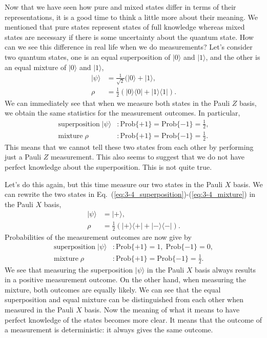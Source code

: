 Now that we have seen how pure and mixed states differ in terms of their representations, it is a good time to think a little more about their meaning.
We mentioned that pure states represent states of full knowledge whereas mixed states are necessary if there is some uncertainty about the quantum state.
How can we see this difference in real life when we do measurements?
Let's consider two quantum states, one is an equal superposition of $|0\rangle$ and $|1\rangle$, and the other is an equal mixture of $|0\rangle$ and $|1\rangle$,
\begin{align}
    |\psi\rangle & = \frac{1}{\sqrt{2}} (|0\rangle + |1\rangle, \label{eq:3-4_superposition}\\
    \rho & = \frac{1}{2} (|0\rangle\langle0| + |1\rangle\langle1|). \label{eq:3-4_mixture}
\end{align}
We can immediately see that when we measure both states in the Pauli $Z$ basis, we obtain the same statistics for the measurement outcomes.
In particular,
\begin{align}
    \text{superposition} \; |\psi\rangle & : \text{Prob}\{+1\} = \text{Prob}\{-1\} = \frac{1}{2},  \\
    \text{mixture} \; \rho & : \text{Prob}\{+1\} = \text{Prob}\{-1\} = \frac{1}{2}.
\end{align}
This means that we cannot tell these two states from each other by performing just a Pauli $Z$ measurement.
This also seems to suggest that we do not have perfect knowledge about the superposition. This is not quite true.

Let's do this again, but this time measure our two states in the Pauli $X$ basis.
We can rewrite the two states in Eq.~(\ref{eq:3-4_superposition})-(\ref{eq:3-4_mixture}) in the Pauli $X$ basis,
\begin{align}
    |\psi\rangle & = |+\rangle, \\
    \rho & = \frac{1}{2} (|+\rangle\langle+| + |-\rangle\langle-|).
\end{align}
Probabilities of the measurement outcomes are now give by
\begin{align}
    \text{superposition} \; |\psi\rangle & : \text{Prob}\{+1\} = 1, \; \text{Prob}\{-1\} = 0,  \\
    \text{mixture} \; \rho & : \text{Prob}\{+1\} = \text{Prob}\{-1\} = \frac{1}{2}.
\end{align}
We see that measuring the superposition $|\psi\rangle$ in the Pauli $X$ basis always results in a positive measurement outcome.
On the other hand, when measuring the mixture, both outcomes are equally likely.
We can see that the equal superposition and equal mixture can be distinguished from each other when measured in the Pauli $X$ basis.
Now the meaning of what it means to have perfect knowledge of the states becomes more clear.
 It means that the outcome of a measurement is deterministic: it always gives the same outcome.

